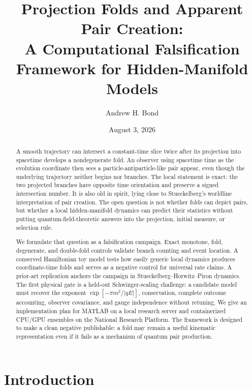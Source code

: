 \documentclass[aps,prd,reprint,nofootinbib,longbibliography]{revtex4-2}
\begin{document}
\title{Projection Folds and Apparent Pair Creation:\\
A Computational Falsification Framework for Hidden-Manifold Models}

\author{Andrew H. Bond}
\date{August 3, 2026}

\begin{abstract}
A smooth trajectory can intersect a constant-time slice twice after its projection
into spacetime develops a nondegenerate fold.  An observer using spacetime time as
the evolution coordinate then sees a particle-antiparticle-like pair appear, even
though the underlying trajectory neither begins nor branches.  The local statement
is exact: the two projected branches have opposite time orientation and preserve a
signed intersection number.  It is also old in spirit, lying close to
Stueckelberg's worldline interpretation of pair creation.  The open question is not
whether folds can depict pairs, but whether a local hidden-manifold dynamics can
predict their statistics without putting quantum-field-theoretic answers into the
projection, initial measure, or selection rule.

We formulate that question as a falsification campaign.  Exact monotone, fold,
degenerate, and double-fold controls validate branch counting and event location.
A conserved Hamiltonian toy model tests how easily generic local dynamics produces
coordinate-time folds and serves as a negative control for universal rate claims.
A prior-art replication anchors the campaign in Stueckelberg--Horwitz--Piron
dynamics.  The first physical gate is a held-out Schwinger-scaling challenge:
a candidate model must recover the exponent $\exp[-\pi m^2/|qE|]$, conservation,
complete outcome accounting, observer covariance, and gauge independence without
retuning.  We give an implementation plan for MATLAB on a local research server
and containerized CPU/GPU ensembles on the National Research Platform.  The
framework is designed to make a clean negative publishable: a fold may remain a
useful kinematic representation even if it fails as a mechanism of quantum pair
production.
\end{abstract}

\maketitle

\section{Introduction}
\end{document}
